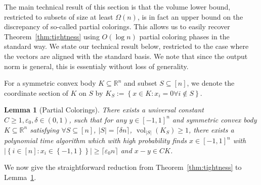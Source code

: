 \documentclass{article}
\newtheorem{lemma}{Lemma}
\newcommand{\ceil}[1]{\lceil #1 \rceil}
\newcommand{\R}{{\mathbb{R}}}
\newcommand\eps{\varepsilon}
\newcommand{\set}[1]{\left\{ #1 \right\}}
\DeclareMathOperator{\vol}{vol}
\begin{document}
The main technical result of this section is that the volume lower bound,
restricted to subsets of size at least $\Omega(n)$, is in fact an upper bound on
the discrepancy of so-called partial colorings. This allows us to easily recover
Theorem~\ref{thm:tightness} using $O(\log n)$ partial coloring phases in the
standard way. We state our technical result below, restricted to the case where
the vectors are aligned with the standard basis. We note that since the output
norm is general, this is essentialy without loss of generality. 

For a symmetric convex body $K \subseteq \R^n$ and subset $S \subseteq [n]$, we
denote the coordinate section of $K$ on $S$ by $K_S := \set{x \in K: x_i = 0
\forall i \notin S}$.

\begin{lemma}[Partial Colorings] \label{lem:partial-via-volume}
There exists a universal constant $C \geq 1, \eps_0, \delta \in (0,1)$, such that
for any $y \in [-1,1]^n$ and symmetric convex body $K \subseteq \R^n$ satisfying
$\forall S \subseteq [n]$, $|S| = \ceil{\delta n}$, $\vol_{|S|}(K_S) \geq 1$, there
exists a polynomial time algorithm which with high probability finds $x \in
[-1,1]^n$ with $|\set{i \in [n]: x_i \in \set{-1,1}}| \geq \ceil{\eps_0 n}$ and
$x-y \in C K$.  
\end{lemma}

We now give the straightforward reduction from Theorem~\ref{thm:tightness} to
Lemma~\ref{lem:partial-via-volume}.
\end{document}
